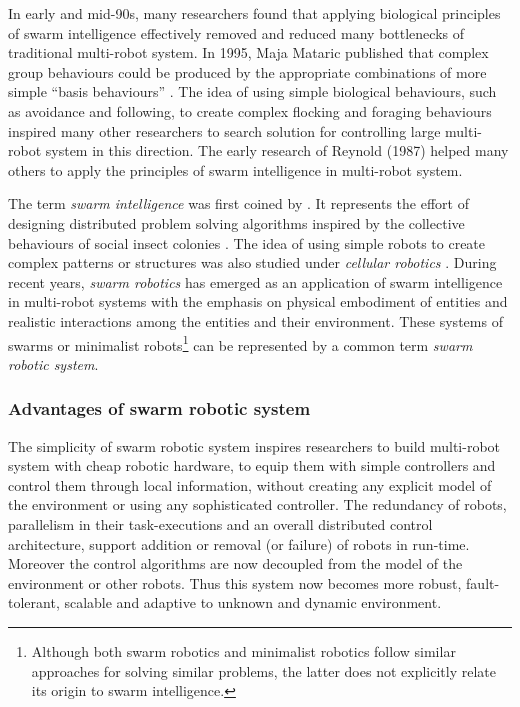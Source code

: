 In early and mid-90s, many researchers found that applying biological principles of swarm intelligence effectively removed and reduced many bottlenecks of traditional multi-robot system.  In 1995, Maja Mataric published that complex group behaviours could be produced by the appropriate combinations of more simple ``basis behaviours'' \cite{Mataric1995}. The idea of using simple biological behaviours, such as avoidance and following, to create complex flocking and foraging behaviours inspired many other researchers to search solution for controlling large multi-robot system in this direction.  The early research of Reynold (1987) helped many others to apply the principles of swarm intelligence in multi-robot system. 

The term {\em swarm intelligence} was first coined by  . It represents the effort of designing distributed problem solving algorithms inspired by the collective behaviours of social insect colonies \cite{Bonabeau+1999}. The idea of using simple robots to create complex patterns or structures was also studied under {\em cellular robotics} \cite{Fukuda+1987}. During recent years, {\em swarm robotics} has emerged as an application of swarm intelligence in multi-robot systems with the emphasis on physical embodiment of entities and realistic interactions among the entities and their environment. These systems of swarms or minimalist robots\footnote{Although both swarm robotics and minimalist robotics follow similar approaches for solving similar problems, the latter does not explicitly relate its origin to swarm intelligence.} can be represented by a common term {\em swarm robotic system}.

\subsubsection*{Advantages of swarm robotic system} 
The simplicity of swarm robotic system inspires researchers to build multi-robot system with cheap robotic hardware, to equip them with simple controllers and control them through local information, without creating any explicit model of the environment or using any sophisticated  controller. The redundancy of robots, parallelism in their task-executions and an overall distributed control architecture, support addition or removal (or failure) of robots in run-time. Moreover the control algorithms are now decoupled from the model of the environment or other robots. Thus this system now becomes more robust, fault-tolerant, scalable and adaptive to unknown and dynamic environment.
